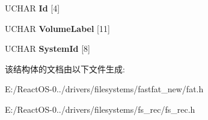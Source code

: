 \begin{DoxyCompactItemize}
\mbox{\label{struct___p_a_c_k_e_d___b_o_o_t___s_e_c_t_o_r_a2c919673995818280e5b9c62fd75ad6b}} 
U\+C\+H\+AR {\bfseries Id} \mbox{[}4\mbox{]}
\item 
\mbox{\label{struct___p_a_c_k_e_d___b_o_o_t___s_e_c_t_o_r_af61c5f9e1891c8dbd208c2f344e7c444}} 
U\+C\+H\+AR {\bfseries Volume\+Label} \mbox{[}11\mbox{]}
\item 
\mbox{\label{struct___p_a_c_k_e_d___b_o_o_t___s_e_c_t_o_r_a82e1e1865d9e38e09be7c92f9b1cda0a}} 
U\+C\+H\+AR {\bfseries System\+Id} \mbox{[}8\mbox{]}
\end{DoxyCompactItemize}


该结构体的文档由以下文件生成\+:\begin{DoxyCompactItemize}
\item 
E\+:/\+React\+O\+S-\/0../drivers/filesystems/fastfat\+\_\+new/fat.\+h\item 
E\+:/\+React\+O\+S-\/0../drivers/filesystems/fs\+\_\+rec/fs\+\_\+rec.\+h\end{DoxyCompactItemize}
